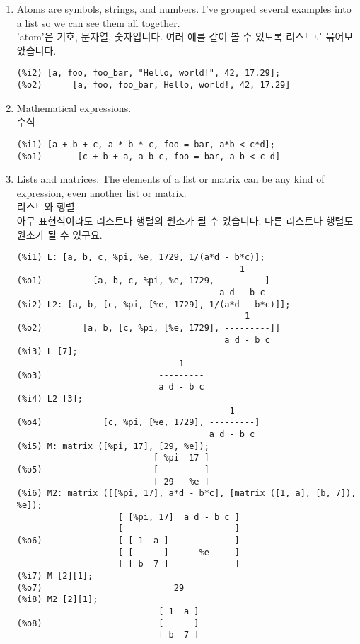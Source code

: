 \documentclass[12pt]{article}
\begin{document}
\begin{enumerate}

\item Atoms are symbols, strings, and numbers.
I've grouped several examples into a list so we can see them all together. \\
'atom'은 기호, 문자열, 숫자입니다. 여러 예를 같이 볼 수 있도록 리스트로 묶어보았습니다.

\begin{verbatim}
(%i2) [a, foo, foo_bar, "Hello, world!", 42, 17.29];
(%o2)      [a, foo, foo_bar, Hello, world!, 42, 17.29]
\end{verbatim}

\item Mathematical expressions. \\
수식

\begin{verbatim}
(%i1) [a + b + c, a * b * c, foo = bar, a*b < c*d];
(%o1)       [c + b + a, a b c, foo = bar, a b < c d]
\end{verbatim}

\item Lists and matrices.
The elements of a list or matrix can be any kind of expression,
even another list or matrix. \\
리스트와 행렬. \\
아무 표현식이라도 리스트나 행렬의 원소가 될 수 있습니다. 다른 리스트나 행렬도 원소가 될 수 있구요.

\begin{verbatim}
(%i1) L: [a, b, c, %pi, %e, 1729, 1/(a*d - b*c)];
                                            1
(%o1)          [a, b, c, %pi, %e, 1729, ---------]
                                        a d - b c
(%i2) L2: [a, b, [c, %pi, [%e, 1729], 1/(a*d - b*c)]];
                                             1
(%o2)        [a, b, [c, %pi, [%e, 1729], ---------]]
                                         a d - b c
(%i3) L [7];
                                1
(%o3)                       ---------
                            a d - b c
(%i4) L2 [3];
                                          1
(%o4)            [c, %pi, [%e, 1729], ---------]
                                      a d - b c
(%i5) M: matrix ([%pi, 17], [29, %e]);
                           [ %pi  17 ]
(%o5)                      [         ]
                           [ 29   %e ]
(%i6) M2: matrix ([[%pi, 17], a*d - b*c], [matrix ([1, a], [b, 7]), %e]);
                    [ [%pi, 17]  a d - b c ]
                    [                      ]
(%o6)               [ [ 1  a ]             ]
                    [ [      ]      %e     ]
                    [ [ b  7 ]             ]
(%i7) M [2][1];
(%o7)                          29
(%i8) M2 [2][1];
                            [ 1  a ]
(%o8)                       [      ]
                            [ b  7 ]
\end{verbatim}


\end{enumerate}
\end{document}
